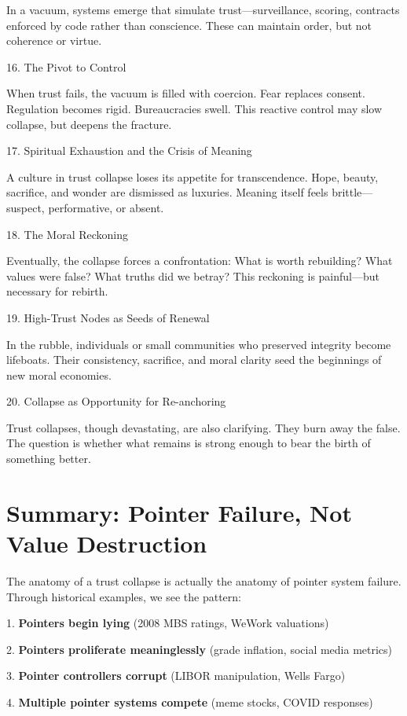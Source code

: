 \documentclass[11pt,oneside]{book}
\begin{document}
In a vacuum, systems emerge that simulate trust—surveillance, scoring, contracts enforced by code rather than conscience. These can maintain order, but not coherence or virtue.

16. The Pivot to Control


When trust fails, the vacuum is filled with coercion. Fear replaces consent. Regulation becomes rigid. Bureaucracies swell. This reactive control may slow collapse, but deepens the fracture.

17. Spiritual Exhaustion and the Crisis of Meaning


A culture in trust collapse loses its appetite for transcendence. Hope, beauty, sacrifice, and wonder are dismissed as luxuries. Meaning itself feels brittle—suspect, performative, or absent.

18. The Moral Reckoning


Eventually, the collapse forces a confrontation: What is worth rebuilding? What values were false? What truths did we betray? This reckoning is painful—but necessary for rebirth.

19. High-Trust Nodes as Seeds of Renewal


In the rubble, individuals or small communities who preserved integrity become lifeboats. Their consistency, sacrifice, and moral clarity seed the beginnings of new moral economies.

20. Collapse as Opportunity for Re-anchoring


Trust collapses, though devastating, are also clarifying. They burn away the false. The question is whether what remains is strong enough to bear the birth of something better.

\section{Summary: Pointer Failure, Not Value Destruction}

The anatomy of a trust collapse is actually the anatomy of pointer system failure. Through historical examples, we see the pattern:


1. \textbf{Pointers begin lying} (2008 MBS ratings, WeWork valuations)


2. \textbf{Pointers proliferate meaninglessly} (grade inflation, social media metrics)


3. \textbf{Pointer controllers corrupt} (LIBOR manipulation, Wells Fargo)


4. \textbf{Multiple pointer systems compete} (meme stocks, COVID responses)
\end{document}

